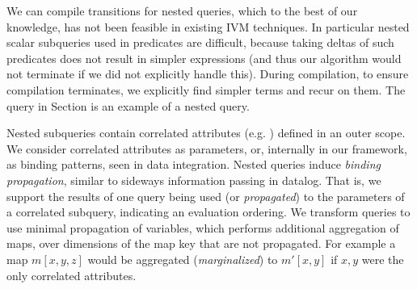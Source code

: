 We can compile transitions for nested queries, which to the best of our
knowledge, has not been feasible in existing IVM techniques. In particular
nested scalar subqueries used in predicates are difficult, because taking deltas
of such predicates does not result in simpler expressions (and thus our
algorithm would not terminate if we did not explicitly handle this). During
compilation, to ensure compilation terminates, we explicitly find simpler terms
and recur on them. The  query in Section \todo{[REF]} is an example
of a nested query.

Nested subqueries contain correlated attributes (e.g. )
defined in an outer scope. We consider correlated attributes as parameters, or,
internally in our framework, as binding patterns, seen in data integration.
Nested queries induce \textit{binding propagation}, similar to sideways
information passing in datalog. That is, we support the results of one query
being used (or \textit{propagated}) to the parameters of a correlated subquery,
indicating an evaluation ordering.
We transform queries to use minimal propagation of variables, which
performs additional aggregation of maps, over dimensions of the map key that
are not propagated. For example a map $m[x,y,z]$ would be aggregated
(\textit{marginalized}) to $m'[x,y]$ if $x,y$ were the only correlated
attributes.






